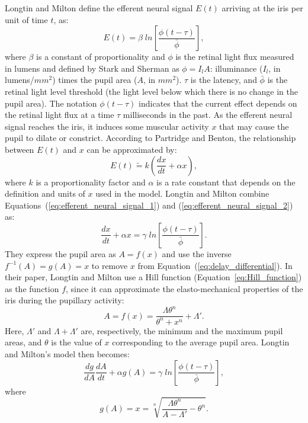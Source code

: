 \documentclass{acmtog}
\begin{document}
Longtin and Milton define the efferent neural signal $E(t)$ arriving at the iris per unit of time $t$,
as: 
\begin{equation}
\label{eq:et}
	E(t) = \beta \; {{ln}} \left[ \frac{ \phi(t-\tau) }{ \bar{\phi} } \right],
	\label{eq:efferent_neural_signal_1}
\end{equation}
where $\beta$ is a constant of proportionality and $\phi$ is the retinal light flux measured in lumens and defined by Stark and Sherman as $\phi = I_{l}A$: illuminance ($I_{l}$, in lumens/$mm^2$)  times the pupil area ($A$, in $mm^2$). $\tau$ is the latency, and $\bar{\phi}$ is the retinal light level threshold (the light level below which there is no change in the pupil area). The notation $\phi(t-\tau)$ indicates that the current effect depends on the retinal light flux at a time $\tau$ milliseconds in the past. As the efferent neural signal reaches the iris, it induces some muscular activity $x$ that may cause the pupil to dilate or constrict. According to Partridge and Benton, the relationship between $E(t)$ and $x$ can be approximated
by:
\begin{equation}
E(t) \tilde{=} k \left( \frac{dx}{dt} + \alpha x \right),
	\label{eq:efferent_neural_signal_2}
\end{equation}
where $k$ is a proportionality factor and $\alpha$ is a rate constant that depends on the definition and units of $x$ used in the model. Longtin and Milton combine Equations~(\ref{eq:efferent_neural_signal_1}) and (\ref{eq:efferent_neural_signal_2})
as:
\begin{equation}
  \label{eq:ativ}
  \frac{dx}{dt} + \alpha x = \gamma \; {{ln}} \left[ \frac{ \phi(t-\tau) }{ \bar{\phi} } \right].
  \label{eq:delay_differential}
\end{equation}
They express the pupil area as  $A = f(x)$ and use the inverse $f^{-1}(A) = g(A) = x$ to remove $x$ from
Equation~(\ref{eq:delay_differential}). In their paper, Longtin and Milton use a Hill function \cite{Duc-2002}
(Equation~\ref{eq:Hill_function}) as the function $f$, since it can approximate the elasto-mechanical properties of the
iris during the pupillary activity:
\begin{equation}
\label{eq:area}
  A = f(x) = \frac{\Lambda\theta^n}{\theta^n+x^n} + \Lambda'.
  \label{eq:Hill_function}
\end{equation}
Here, $\Lambda'$ and $\Lambda + \Lambda'$ are, respectively, the minimum and the maximum pupil areas, and $\theta$ is the value of $x$ corresponding to the average pupil area. Longtin and Milton's model then becomes:  
\begin{equation}
  \frac{dg}{dA}\frac{dA}{dt} + \alpha g(A) = \gamma \; {{ln}} \left[ \frac{ \phi(t-\tau) }{ \bar{\phi} }
\right],
\label{eq:longtin}
\end{equation} 
where
\begin{equation}
  g(A) = x = \sqrt[n]{ \frac {\Lambda \theta^n} { A - \Lambda'} - \theta^n }.
\label{eq:inverseHill}
\end{equation} 
\end{document}
